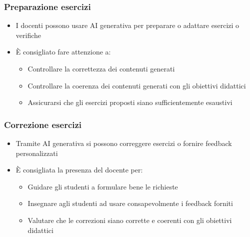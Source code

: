 \begin{contentframe}
    \frametitle{Preparazione esercizi}

    \begin{itemize}
        \item I docenti possono usare AI generativa per preparare o adattare esercizi o verifiche

        \bigskip
        \item È consigliato fare attenzione a:
        \begin{itemize}
            \item Controllare la correttezza dei contenuti generati
            \item Controllare la coerenza dei contenuti generati con gli obiettivi didattici
            \item Assicurarsi che gli esercizi proposti siano sufficientemente esaustivi
        \end{itemize}
    \end{itemize}
\end{contentframe}

\begin{contentframe}
    \frametitle{Correzione esercizi}

    \begin{itemize}
        \item Tramite AI generativa si possono correggere esercizi o fornire feedback personalizzati

        \bigskip
        \item È consigliata la presenza del docente per:
        \begin{itemize}
            \item Guidare gli studenti a formulare bene le richieste
            \item Insegnare agli studenti ad usare consapevolmente i feedback forniti
            \item Valutare che le correzioni siano corrette e coerenti con gli obiettivi didattici
        \end{itemize}
    \end{itemize}
\end{contentframe}


